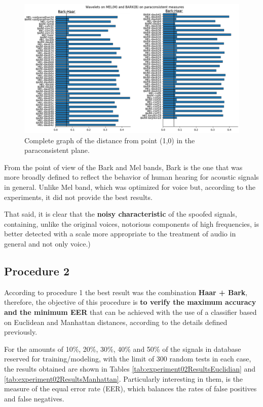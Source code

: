 		\begin{figure}[H]
			\centering
			\includegraphics[scale=.65]{images/results/paraconsistentPlane/ParaconsistentFull.png}
			\caption{Complete graph of the distance from point (1,0) in the paraconsistent plane.}
			\label{fig:paraconsistentfull}
		\end{figure}
	
		\par From the point of view of the Bark and Mel bands, Bark is the one that was more broadly defined to reflect the behavior of human hearing for acoustic signals in general. Unlike Mel band, which was optimized for voice but, according to the experiments, it did not provide the best results.\\
		\par That said, it is clear that the \textbf{noisy characteristic} of the spoofed signals, containing, unlike the original voices, notorious components of high frequencies, is better detected with a scale more appropriate to the treatment of audio in general and not only voice.)
	\subsection{Procedure 2} 
		\label{sec:testsResults:subsec:Experimento02}
		\par According to procedure 1 the best result was the combination \textbf{Haar + Bark}, therefore, the objective of this procedure is \textbf{to verify the maximum accuracy and the minimum EER} that can be achieved with the use of a classifier based on Euclidean and Manhattan distances, according to the details defined previously.\\
		
		\par For the amounts of 10\%, 20\%, 30\%, 40\% and 50\% of the signals in database reserved for training/modeling, with the limit of 300 random tests in each case, the results obtained are shown in Tables \ref{tab:experiment02ResultsEuclidian} and \ref{tab:experiment02ResultsManhattan}. Particularly interesting in them, is the measure of the equal error rate (EER), which balances the rates of false positives and false negatives.\\
		
